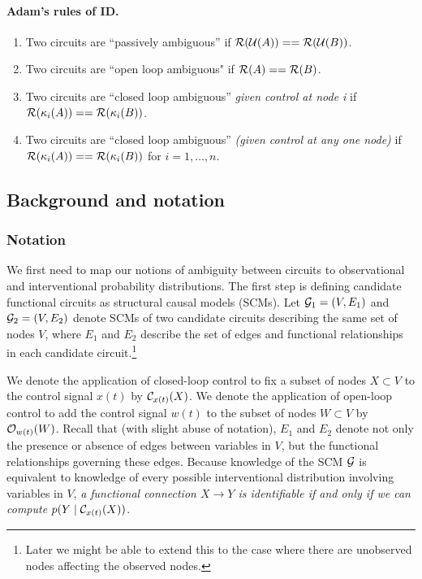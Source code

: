 \paragraph{Adam's rules of ID.}
\begin{enumerate}  
    \item Two circuits are ``passively ambiguous'' if $\mathcal{R}(\mathcal{U}(A)) == \mathcal{R}(\mathcal{U}(B))$.
    \item Two circuits are ``open loop ambiguous" if $\mathcal{R}(A) == \mathcal{R}(B)$.
    \item Two circuits are ``closed loop ambiguous'' \textit{given control at node i} if $\mathcal{R}(\kappa_i(A)) == \mathcal{R}(\kappa_i(B))$.
    \item Two circuits are ``closed loop ambiguous'' \textit{(given control at any one node)} if $\mathcal{R}(\kappa_i(A)) == \mathcal{R}(\kappa_i(B))$ for $i = 1, \dots, n$.
\end{enumerate}


\subsection{Background and notation}

\subsubsection{Notation}

We first need to map our notions of ambiguity between circuits to observational and interventional probability distributions. The first step is defining candidate functional circuits as structural causal models (SCMs). Let $\mathcal{G}_1 = (V,E_1)$ and $\mathcal{G}_2 = (V,E_2)$ denote SCMs of two candidate circuits describing the same set of nodes $V$, where $E_1$ and $E_2$ describe the set of edges and functional relationships in each candidate circuit.\footnote{Later we might be able to extend this to the case where there are unobserved nodes affecting the observed nodes.}

We denote the application of closed-loop control to fix a subset of nodes $X \subset V$ to the control signal $x(t)$ by $\mathcal{C}_{x(t)}(X)$. We denote the application of open-loop control to add the control signal $w(t)$ to the subset of nodes $W \subset V$ by $\mathcal{O}_{w(t)}(W)$. Recall that (with slight abuse of notation), $E_1$ and $E_2$ denote not only the presence or absence of edges between variables in $V$, but the functional relationships governing these edges. Because knowledge of the SCM $\mathcal{G}$ is equivalent to knowledge of every possible interventional distribution involving variables in $V$, \emph{a functional connection $X \to Y$ is identifiable if and only if we can compute $p(Y \mid \mathcal{C}_{x(t)}(X))$}.

